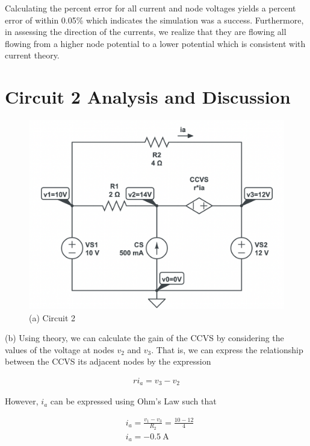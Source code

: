 \documentclass[12pt]{article}
\begin{document}
Calculating the percent error for all current and node voltages yields a percent error of within 0.05\% which indicates the simulation was a success. Furthermore, in assessing the direction of the currents, we realize that they are flowing all flowing from a higher node potential to a lower potential which is consistent with current theory.

\section{Circuit 2 Analysis and Discussion}
\begin{figure}[H]
    \begin{center}
        \includegraphics[scale=0.4]{circuit-2.png}
        \caption { (a) Circuit 2}
    \end{center}
\end{figure}

(b) Using theory, we can calculate the gain of the CCVS by considering the values of the voltage at nodes $v_2$ and $v_3$. That is, we can express the relationship between the CCVS its adjacent nodes by the expression

\begin{equation}
    \begin{split}
        ri_a = v_3 - v_2
    \end{split}
\end{equation}

However, $i_a$ can be expressed using Ohm's Law such that

\begin{equation}
    \begin{split}
        &i_a = \frac{v_1-v_3}{R_2} = \frac{10 - 12}{4} \\
        &i_a = \SI{-0.5}{\ampere}
    \end{split}
\end{equation}
\end{document}
